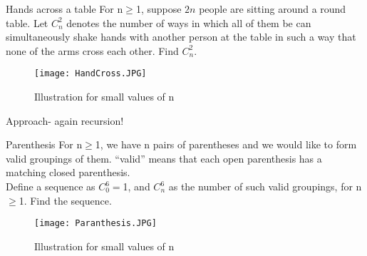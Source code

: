 \documentclass[handout, dvipsnames]{beamer}
\theoremstyle{definition}
\begin{document}
\begin{frame}{Hands across a table}
    For n$\geq$1, suppose $2n$ people are sitting around a round table. Let $C_n^2$ denotes the number of ways in which all of them be can simultaneously shake hands with another person at the table in such a way that none of the arms cross each other. Find $C_n^2$.
    \begin{figure}
        \centering
        \texttt{[image: HandCross.JPG]}
        \caption{Illustration for small values of n}
        \label{fig:my_label}
    \end{figure}
\end{frame}

\begin{frame}{Approach- again recursion!}
    \begin{enumerate}
    \end{enumerate}
\end{frame}


\begin{frame}{Parenthesis}
    For n$\geq$1, we have n pairs of parentheses and we would like to form valid groupings of them. “valid” means that each open parenthesis has a matching closed parenthesis.\\
    Define a sequence as $C_0^6=$1, and $C_n^6$ as the number of such valid groupings, for n$\geq$1. Find the sequence. 
    \begin{figure}
        \centering
        \texttt{[image: Paranthesis.JPG]}
        \caption{Illustration for small values of n}
        \label{fig:my_label}
    \end{figure}
\end{frame}
\end{document}
